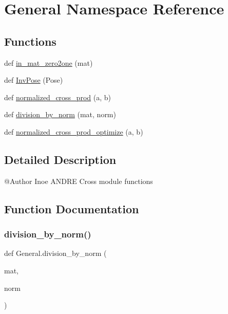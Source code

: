 \hypertarget{namespace_general}{}\section{General Namespace Reference}
\label{namespace_general}
\subsection*{Functions}
\begin{DoxyCompactItemize}
\item 
def \hyperlink{namespace_general_a9fafbff15974c6b9a6032e6f5b568808}{in\+\_\+mat\+\_\+zero2one} (mat)
\item 
def \hyperlink{namespace_general_a7fb8753b34ce7bd6133dda90add3aa73}{Inv\+Pose} (Pose)
\item 
def \hyperlink{namespace_general_aafcc697815eaa5f02073a65381657756}{normalized\+\_\+cross\+\_\+prod} (a, b)
\item 
def \hyperlink{namespace_general_acbd88c2bfc6296ec9d5714f5fa7116f8}{division\+\_\+by\+\_\+norm} (mat, norm)
\item 
def \hyperlink{namespace_general_adfadd7bf376e5e61f7ff3814f92dea05}{normalized\+\_\+cross\+\_\+prod\+\_\+optimize} (a, b)
\end{DoxyCompactItemize}


\subsection{Detailed Description}
\begin{DoxyVerb}@Author Inoe ANDRE
Cross module functions
\end{DoxyVerb}
 

\subsection{Function Documentation}
\mbox{\label{namespace_general_acbd88c2bfc6296ec9d5714f5fa7116f8}} 
\subsubsection{\texorpdfstring{division\+\_\+by\+\_\+norm()}{division\_by\_norm()}}
{\footnotesize\ttfamily def General.\+division\+\_\+by\+\_\+norm (\begin{DoxyParamCaption}\item[{}]{mat,  }\item[{}]{norm }\end{DoxyParamCaption})}

